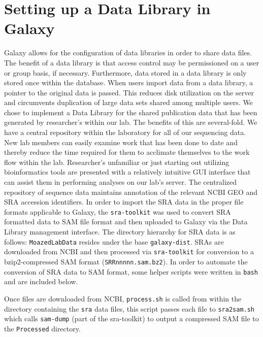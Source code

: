 \documentclass[a4paper,10pt]{article}
\begin{document}
\section{Setting up a Data Library in Galaxy}
Galaxy allows for the configuration of data libraries in order to share data files.  The benefit of a data library is that access control may be permissioned on a user or group basis, if necessary.  Furthermore, data stored in a data library is only stored once within the database.  When users import data from a data library, a pointer to the original data is passed.  This reduces disk utilization on the server and circumvents duplication of large data sets shared among multiple users.
We chose to implement a Data Library for the shared publication data that has been generated by researcher's within our lab.  The benefits of this are several-fold.  We have a central repository within the laboratory for all of our sequencing data.  New lab members can easily examine work that has been done to date and thereby reduce the time required for them to acclimate themselves to the work flow within the lab.  Researcher's unfamiliar or just starting out utilizing bioinformatics tools are presented with a relatively intuitive GUI interface that can assist them in performing analyses on our lab's server.  The centralized repository of sequence data maintains annotation of the relevant NCBI GEO and SRA accession identifiers.  In order to import the SRA data in the proper file formats applicable to Galaxy, the \texttt{\footnotesize{sra-toolkit}} was used to convert SRA formatted data to SAM file format and then uploaded to Galaxy via the Data Library management interface.
The directory hierarchy for SRA data is as follows:\vspace{1em}
\vspace{1em}
\texttt{\footnotesize{MoazedLabData}} resides under the base \texttt{\footnotesize{galaxy-dist}}.  SRAs are downloaded from NCBI and then processed via \texttt{\footnotesize{sra-toolkit}} for conversion to a bzip2-compressed SAM format (\texttt{\footnotesize{SRRnnnnn.sam.bz2}}).
In order to automate the conversion of SRA data to SAM format, some helper scripts were written in \texttt{\footnotesize{bash}} and are included below.



Once files are downloaded from NCBI, \texttt{\footnotesize{process.sh}} is called from within the directory containing the \texttt{\footnotesize{sra}} data files, this script passes each file to \texttt{\footnotesize{sra2sam.sh}} which calls \texttt{\footnotesize{sam-dump}} (part of the sra-toolkit) to output a compressed SAM file to the \texttt{\footnotesize{Processed}} directory.
\end{document}
